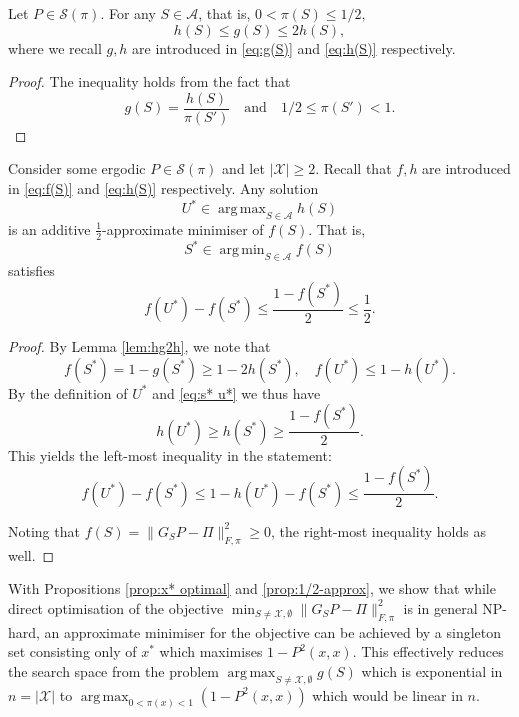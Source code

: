 \documentclass[EJP]{ejpecp} %
\DeclareMathOperator*{\argmin}{arg\,min}
\DeclareMathOperator*{\argmax}{arg\,max}
\begin{document}
\begin{lemma}\label{lem:hg2h}
    Let $P \in \mathcal{S}(\pi)$. For any $S \in \mathcal{A}$, that is, $0 < \pi(S) \leq 1/2,$
    \begin{equation*}
        h(S) \leq g(S) \leq 2h(S),
    \end{equation*}
    where we recall $g, h$ are introduced in \eqref{eq:g(S)} and \eqref{eq:h(S)} respectively.
\end{lemma}

\begin{proof}
    The inequality holds from the fact that 
    $$g(S) = \frac{h(S)}{\pi(S')}\quad \mathrm{and}\quad 1/2 \leq \pi(S') < 1.$$
\end{proof}

\begin{proposition} \label{prop:1/2-approx}
    Consider some ergodic $P \in \mathcal{S}(\pi)$ and let $|\mathcal{X}| \geq 2$. Recall that $f, h$ are introduced in \eqref{eq:f(S)} and \eqref{eq:h(S)} respectively. Any solution
    $$U^* \in \argmax_{S\in \mathcal{A}} h(S)$$
    is an additive $\frac{1}{2}$-approximate minimiser of $f(S)$. That is, 
    $$S^* \in \argmin_{S\in \mathcal{A}} f(S)$$ 
    satisfies 
    $$f(U^*) - f(S^*) \leq \frac{1-f(S^*)}{2} \leq \frac{1}{2}.$$
\end{proposition}

\begin{proof}
    By Lemma \ref{lem:hg2h}, we note that 
    \begin{equation} \label{eq:s* u*}
        f(S^*) = 1-g(S^*) \geq 1-2h(S^*), \quad f(U^*) \leq 1-h(U^*).
    \end{equation}
    By the definition of $U^*$ and \eqref{eq:s* u*} we thus have
    $$h(U^*) \geq h(S^*) \geq \frac{1-f(S^*)}{2}.$$
    This yields the left-most inequality in the statement:
    $$f(U^*) - f(S^*) \leq 1-h(U^*)-f(S^*) \leq \frac{1-f(S^*)}{2}.$$

    Noting that $f(S) = \|G_S P - \Pi\|_{F, \pi}^2 \geq 0$, the right-most inequality holds as well.  
\end{proof}

With Propositions \ref{prop:x* optimal} and \ref{prop:1/2-approx}, we show that while direct optimisation of the objective $\min_{S \neq \mathcal{X}, \emptyset} \|G_S P - \Pi\|_{F, \pi}^2$ is in general NP-hard, an approximate minimiser for the objective can be achieved by a singleton set consisting only of $x^*$ which maximises $1-P^2(x,x)$. This effectively reduces the search space from the problem $\argmax_{S \neq \mathcal{X}, \emptyset} g(S)$ which is exponential in $n = |\mathcal{X}|$ to $\argmax_{0 < \pi(x) < 1} \left(1-P^2(x,x)\right)$ which would be linear in $n$.
\end{document}

